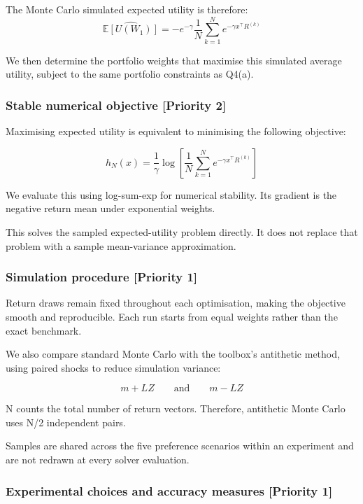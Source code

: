 \documentclass[
  10pt,
  a4paper,
]{article}
\begin{document}
The Monte Carlo simulated expected utility is therefore: \[
\widehat{\mathbb E[U(W_1)]}=-e^{-\gamma}\frac1N\sum_{k=1}^{N}e^{-\gamma x^\top R^{(k)}}
\]

We then determine the portfolio weights that maximise this simulated
average utility, subject to the same portfolio constraints as Q4(a).

\hypertarget{stable-numerical-objective-priority-2}{%
\subsubsection{Stable numerical objective {[}Priority
2{]}}\label{stable-numerical-objective-priority-2}}

Maximising expected utility is equivalent to minimising the following
objective:

\[
h_N(x)=\frac1\gamma\log\!\left[\frac1N\sum_{k=1}^{N}e^{-\gamma x^\top R^{(k)}}\right]
\]

We evaluate this using log-sum-exp for numerical stability. Its gradient
is the negative return mean under exponential weights.

This solves the sampled expected-utility problem directly. It does not
replace that problem with a sample mean-variance approximation.

\hypertarget{simulation-procedure-priority-1}{%
\subsubsection{Simulation procedure {[}Priority
1{]}}\label{simulation-procedure-priority-1}}

Return draws remain fixed throughout each optimisation, making the
objective smooth and reproducible. Each run starts from equal weights
rather than the exact benchmark.

We also compare standard Monte Carlo with the toolbox's antithetic
method, using paired shocks to reduce simulation variance:

\[
m+LZ\qquad\text{and}\qquad m-LZ
\]

N counts the total number of return vectors. Therefore, antithetic Monte
Carlo uses N/2 independent pairs.

Samples are shared across the five preference scenarios within an
experiment and are not redrawn at every solver evaluation.

\hypertarget{experimental-choices-and-accuracy-measures-priority-1}{%
\subsubsection{Experimental choices and accuracy measures {[}Priority
1{]}}\label{experimental-choices-and-accuracy-measures-priority-1}}
\end{document}
